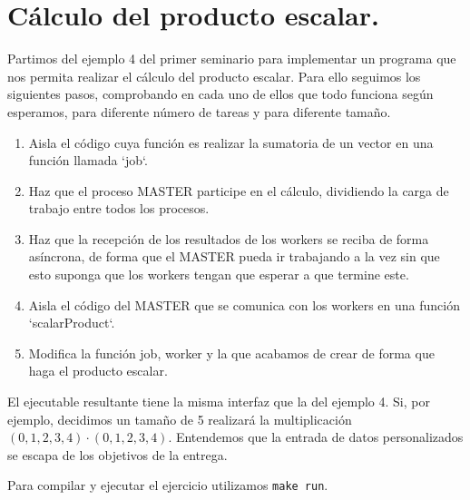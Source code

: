 \section{Cálculo del producto escalar.}

Partimos del ejemplo 4 del primer seminario para implementar un programa
que nos permita realizar el cálculo del producto escalar. Para ello seguimos
los siguientes pasos, comprobando en cada uno de ellos que todo funciona según esperamos,
para diferente número de tareas y para diferente tamaño.

\begin{enumerate}
    \item Aisla el código cuya función es realizar la sumatoria de un vector en una función llamada `job`.
    \item Haz que el proceso MASTER participe en el cálculo, dividiendo la carga de trabajo entre todos los procesos.
    \item Haz que la recepción de los resultados de los workers se reciba de forma asíncrona, de forma que el MASTER pueda ir trabajando a la vez sin que esto suponga que los workers tengan que esperar a que termine este.
    \item Aisla el código del MASTER que se comunica con los workers en una función `scalarProduct`.
    \item Modifica la función job, worker y la que acabamos de crear de forma que haga el producto escalar.
\end{enumerate}

El ejecutable resultante tiene la misma interfaz que la del ejemplo 4.
Si, por ejemplo, decidimos un tamaño de 5 realizará la multiplicación $(0,1,2,3,4) \cdot (0,1,2,3,4)$.
Entendemos que la entrada de datos personalizados se escapa de los objetivos de la entrega.

Para compilar y ejecutar el ejercicio utilizamos \texttt{make run}.
